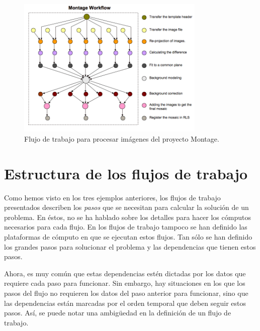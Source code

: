 \begin{figure}
    \begin{center}
        \includegraphics[width=0.8\textwidth]{imagenes/montage-workflow}
    \end{center}
    \caption{Flujo de trabajo para procesar imágenes del proyecto Montage.}
    \label{fig:montage-workflow}
\end{figure}



\section{Estructura de los flujos de trabajo}
\label{secc:workflow_str}
Como hemos visto en los tres ejemplos anteriores, los flujos de trabajo presentados describen los \emph{pasos} que se necesitan para calcular la solución de un problema. En éstos, no se ha hablado sobre los detalles para hacer los cómputos necesarios para cada flujo. En los flujos de trabajo tampoco se han definido las plataformas de cómputo en que se ejecutan estos flujos. Tan sólo se han definido los grandes pasos para solucionar el problema y las dependencias que tienen estos pasos. 

Ahora, es muy común que estas dependencias estén dictadas por los datos que requiere cada paso para funcionar. Sin embargo, hay situaciones en los que los pasos del flujo no requieren los datos del paso anterior para funcionar, sino que las dependencias están marcadas por el orden temporal que deben seguir estos pasos. Así, se puede notar una ambigüedad en la definición de un flujo de trabajo.


